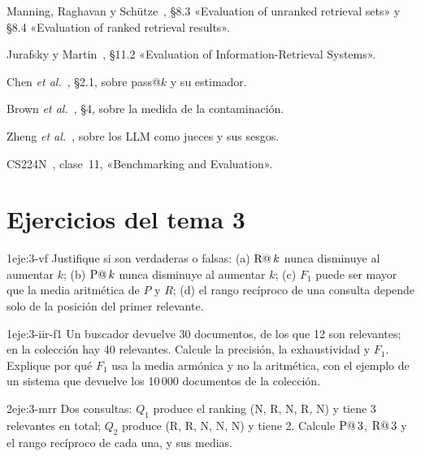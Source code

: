 \begin{lecturas}
\item Manning, Raghavan y Schütze~\cite{iir}, §8.3 «Evaluation of unranked retrieval sets» y §8.4 «Evaluation of ranked retrieval results».
\item Jurafsky y Martin~\cite{jm3}, §11.2 «Evaluation of Information-Retrieval Systems».
\item Chen \emph{et al.}~\cite{chen-codex}, §2.1, sobre pass@$k$ y su estimador.
\item Brown \emph{et al.}~\cite{brown}, §4, sobre la medida de la contaminación.
\item Zheng \emph{et al.}~\cite{zheng}, sobre los LLM como jueces y sus sesgos.
\item CS224N~\cite{cs224n}, clase~11, «Benchmarking and Evaluation».
\end{lecturas}

\section*{Ejercicios del tema 3}

\begin{ejercicio}{1}{eje:3-vf}
Justifique si son verdaderas o falsas: (a) $\operatorname{R@}k$ nunca disminuye al aumentar $k$; (b) $\operatorname{P@}k$ nunca disminuye al aumentar $k$; (c) $F_1$ puede ser mayor que la media aritmética de $P$ y $R$; (d) el rango recíproco de una consulta depende solo de la posición del primer relevante.
\end{ejercicio}

\begin{ejercicio}{1}{eje:3-iir-f1}
Un buscador devuelve 30 documentos, de los que 12 son relevantes; en la colección hay 40 relevantes. Calcule la precisión, la exhaustividad y $F_1$. Explique por qué $F_1$ usa la media armónica y no la aritmética, con el ejemplo de un sistema que devuelve los 10\,000 documentos de la colección.
\end{ejercicio}

\begin{ejercicio}{2}{eje:3-mrr}
Dos consultas: $Q_1$ produce el ranking (N, R, N, R, N) y tiene 3 relevantes en total; $Q_2$ produce (R, R, N, N, N) y tiene 2. Calcule $\operatorname{P@}3$, $\operatorname{R@}3$ y el rango recíproco de cada una, y sus medias.
\end{ejercicio}

